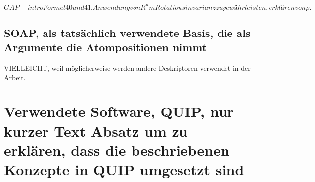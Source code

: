 $$ GAP-intro Formel 40 und 41. Anwendung von R^ um Rotationsinvarianz zu gewährleisten, erklären von \rho. $$



\subsection{SOAP, als tatsächlich verwendete Basis, die als Argumente die Atompositionen nimmt}
VIELLEICHT, weil möglicherweise werden andere Deskriptoren verwendet in der Arbeit. 

\section{Verwendete Software, QUIP, nur kurzer Text Absatz um zu erklären, dass die beschriebenen Konzepte in QUIP umgesetzt sind}




